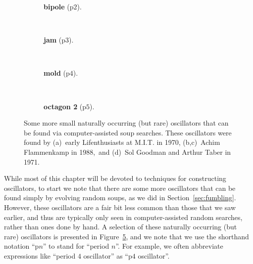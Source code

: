 \begin{figure}[!htb]
	\centering
	\begin{subfigure}{.2\textwidth}
		\centering
		\caption{\textbf{bipole} (p$2$).}
		\label{fig:bipole}
	\end{subfigure} \ \ \ \ %
	\begin{subfigure}{.2\textwidth}
		\centering
		\caption{\textbf{jam} (p$3$).}
		\label{fig:jam}
	\end{subfigure} \ \ \ \ %
	\begin{subfigure}{.2\textwidth}
		\centering
		\caption{\textbf{mold} (p$4$).}
		\label{fig:mold}
	\end{subfigure} \ \ \ \ %
	\begin{subfigure}{.23\textwidth}
		\centering
		\caption{\textbf{octagon 2} (p$5$).}
		\label{fig:octagon_2}
	\end{subfigure}
	\caption{Some more small naturally occurring (but rare) oscillators that can be found via computer-assisted soup searches. These oscillators were found by (a)~early Lifenthusiasts at M.I.T. in 1970, (b,c)~Achim Flammenkamp in 1988,\protect\footnotemark \ and (d)~Sol Goodman and Arthur Taber in 1971.}\label{fig:natural_but_rare_oscillators}
\end{figure}

While most of this chapter will be devoted to techniques for constructing oscillators, to start we note that there are some more oscillators that can be found simply by evolving random soups, as we did in Section~\ref{sec:fumbling}. However, these oscillators are a fair bit less common than those that we saw earlier, and thus are typically only seen in computer-assisted random searches, rather than ones done by hand. A selection of these naturally occurring (but rare) oscillators is presented in Figure~\ref{fig:natural_but_rare_oscillators}, and we note that we use the shorthand notation ``p$n$'' to stand for ``period $n$''. For example, we often abbreviate expressions like ``period $4$ oscillator'' as ``p$4$ oscillator''.


